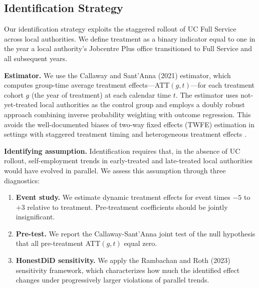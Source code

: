 \documentclass[12pt]{article}
\begin{document}


\subsection{Identification Strategy}

Our identification strategy exploits the staggered rollout of UC Full Service across local authorities. We define treatment as a binary indicator equal to one in the year a local authority's Jobcentre Plus office transitioned to Full Service and all subsequent years.

\textbf{Estimator.} We use the Callaway and Sant'Anna (2021) estimator, which computes group-time average treatment effects---ATT$(g,t)$---for each treatment cohort $g$ (the year of treatment) at each calendar time $t$. The estimator uses not-yet-treated local authorities as the control group and employs a doubly robust approach combining inverse probability weighting with outcome regression. This avoids the well-documented biases of two-way fixed effects (TWFE) estimation in settings with staggered treatment timing and heterogeneous treatment effects \citep{goodman-baconDifferenceinDifferencesVariationTreatment2021, dechaisemartinTwoWayFixed2020}.

\textbf{Identifying assumption.} Identification requires that, in the absence of UC rollout, self-employment trends in early-treated and late-treated local authorities would have evolved in parallel. We assess this assumption through three diagnostics:

\begin{enumerate}
    \item \textbf{Event study.} We estimate dynamic treatment effects for event times $-5$ to $+3$ relative to treatment. Pre-treatment coefficients should be jointly insignificant.

    \item \textbf{Pre-test.} We report the Callaway-Sant'Anna joint test of the null hypothesis that all pre-treatment ATT$(g,t)$ equal zero.

    \item \textbf{HonestDiD sensitivity.} We apply the Rambachan and Roth (2023) sensitivity framework, which characterizes how much the identified effect changes under progressively larger violations of parallel trends.
\end{enumerate}
\end{document}
